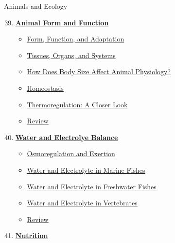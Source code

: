 \documentclass[12pt,letterpaper]{article}
\begin{document}

\begin{contbox}{Animals and Ecology}{ 
\begin{enumerate}[font=\bfseries, wide]
    \setcounter{enumi}{38}
\item \hyperlink{39}{\textbf{Animal Form and Function}}
    \begin{itemize}
        \item \hyperlink{39.1}{Form, Function, and Adaptation}
        \item \hyperlink{39.2}{Tissues, Organs, and Systems}
        \item \hyperlink{39.3}{How Does Body Size Affect Animal Physiology?}
        \item \hyperlink{39.4}{Homeostasis}
        \item \hyperlink{39.5}{Thermoregulation: A Closer Look}
        \item \hyperlink{39.r}{Review}
    \end{itemize}
\item \hyperlink{40}{\textbf{Water and Electrolye Balance}}
    \begin{itemize}
        \item \hyperlink{40.1}{Osmoregulation and Exertion}
        \item \hyperlink{40.2}{Water and Electrolyte in Marine Fishes}
        \item \hyperlink{40.3}{Water and Electrolyte in Freshwater Fishes}
        \item \hyperlink{40.5}{Water and Electrolyte in Vertebrates}
        \item \hyperlink{40.r}{Review}
    \end{itemize}
\item \hyperlink{41}{\textbf{Nutrition}}

\end{enumerate}}
\end{contbox}
\end{document}
